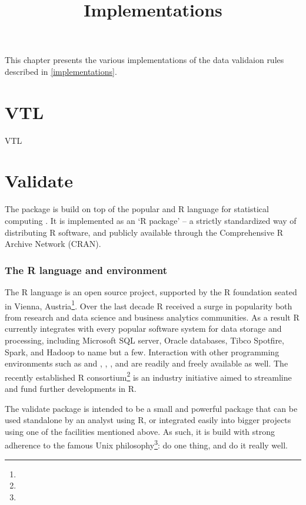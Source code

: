 \title{Implementations}

\vspace{0.6 cm}

\noindent
This chapter presents the various implementations of the data validaion rules described in \ref{implementations}.

\section{VTL}

VTL

\section{Validate}

The  package \citep{loo:2015} is build on top of the popular and
R language for statistical computing \citep{rcore:2015}. It is
implemented as an `R package' -- a strictly standardized way of distributing R
software, and publicly available through the Comprehensive R Archive Network
(CRAN). 

\subsubsection{The R language and environment}
The R language is an open source project, supported by the R foundation seated
in Vienna, Austria\footnote{}.
Over the last decade R received a surge in popularity both from research and
data science and business analytics communities. As a result R currently
integrates with every popular software system for data storage and processing,
including Microsoft SQL server, Oracle databases, Tibco Spotfire, Spark, and
Hadoop to name but a few.  Interaction with other programming environments such
as  and , , , and  are
readily and freely available as well. The recently established R
consortium\footnote{} is an industry
initiative aimed to streamline and fund further developments in R.


The validate package is intended to be a small and powerful package that can be
used standalone by an analyst using R, or integrated easily into bigger
projects using one of the facilities mentioned above. As such, it is build with
strong adherence to the famous Unix
philosophy\footnote{}: do
one thing, and do it really well.


